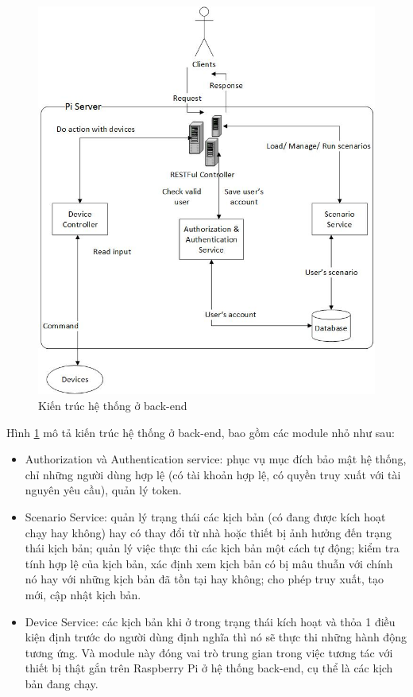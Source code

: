 \documentclass[12pt,a4paper,oneside]{extbook}
\begin{document}
\begin{figure}[h]
  \centering
     \includegraphics[width=15cm]{3-architecture-back-end}
  \caption{Kiến trúc hệ thống ở back-end}\label{fig:3-architecture-back-end}
\end{figure} 

\noindent
Hình \ref{fig:3-architecture-back-end} mô tả kiến trúc hệ thống ở back-end, bao gồm các module nhỏ như sau:

\begin{itemize}[topsep=1mm,itemsep=-0.5mm]
\item Authorization và Authentication service: phục vụ mục đích bảo mật hệ thống, chỉ những người dùng hợp lệ (có tài khoản hợp lệ, có quyền truy xuất với tài nguyên yêu cầu), quản lý token.
\item Scenario Service: quản lý trạng thái các kịch bản (có đang được kích hoạt chạy hay không) hay có thay đổi từ nhà hoặc thiết bị ảnh hưởng đến trạng thái kịch bản; quản lý việc thực thi các kịch bản một cách tự động; kiểm tra tính hợp lệ của kịch bản, xác định xem kịch bản có bị mâu thuẫn với chính nó hay với những kịch bản đã tồn tại hay không; cho phép truy xuất, tạo mới, cập nhật kịch bản.
\item Device Service: các kịch bản khi ở trong trạng thái kích hoạt và thỏa 1 điều kiện định trước do người dùng định nghĩa thì nó sẽ thực thi những hành động tương ứng. Và module này đóng vai trò trung gian trong việc tương tác với thiết bị thật gắn trên Raspberry Pi ở hệ thống back-end, cụ thể là các kịch bản đang chạy.
\vspace{1mm}
\end{itemize}
\end{document}
